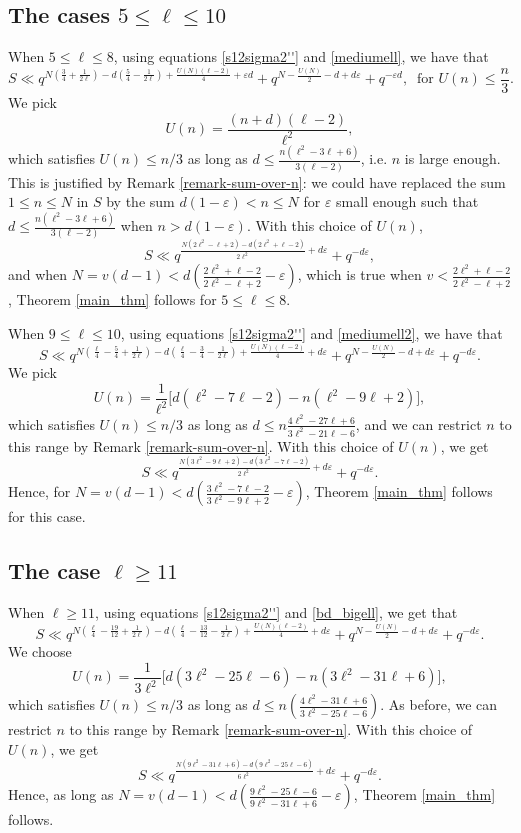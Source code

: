 \documentclass[12pt]{amsart}
\begin{document}
\subsection{The cases $5 \leq \ell \leq 10$}
When $5 \leq \ell \leq 8$, using equations \eqref{s12sigma2''} and \eqref{mediumell}, we have that
$$S \ll q^{N ( \frac{3}{4}+\frac{1}{2\ell})-d(\frac{5}{4}-\frac{1}{2\ell})+ \frac{U(N) (\ell-2)}{4}+\varepsilon d}+ q^{N-\frac{U(N)}{2}-d+d\varepsilon}+ q^{-\varepsilon d}, \;\; \text{for $U(n) \leq \frac{n}{3}$}. $$
We pick
$$U(n) = \frac{ (n+d)(\ell-2)}{\ell^2},$$
which satisfies $U(n)  \leq n/3$ as long as $d \leq \frac{n(\ell^2-3\ell+6)}{3(\ell-2)}$, i.e. $n$ is large enough. This is justified by Remark \ref{remark-sum-over-n}: we could have replaced the sum $1 \leq n \leq N$ in $S$ by the sum $d(1-\varepsilon) < n \leq N$ for $\varepsilon$ small enough such that $d \leq \frac{n(\ell^2-3\ell+6)}{3(\ell-2)}$ when $n > d(1-\varepsilon)$.
With this choice of $U(n)$, 
$$S \ll q^{ \frac{N(2\ell^2-\ell+2)-d(2\ell^2+\ell-2)}{2\ell^2}+d\varepsilon } +q^{-d\varepsilon },$$
and when $N = v(d-1) < d ( \frac{2\ell^2+\ell-2}{2\ell^2-\ell+2}-\varepsilon)$, which is true when $v < \frac{2 \ell^2 + \ell -2}{2\ell^2 - \ell + 2}$, Theorem \ref{main_thm} follows for $5 \leq \ell \leq 8$.




When $9 \leq \ell \leq 10$, using equations \eqref{s12sigma2''} and \eqref{mediumell2}, we have that 
$$ S \ll q^{N (\frac{\ell}{4}-\frac{5}{4}+\frac{1}{2\ell}) - d (\frac{\ell}{4} - \frac{3}{4}-\frac{1}{2\ell})+\frac{U(N)(\ell-2)}{4}+d\varepsilon }+ q^{N-\frac{U(N)}{2}-d+d\varepsilon}+ q^{-d\varepsilon }.$$
We pick
$$U(n) = \frac{1}{\ell^2} \Big[ d(\ell^2-7\ell-2) - n (\ell^2-9\ell+2)\Big],$$
which satisfies $U(n)\leq n/3$ as long as $d \leq n \frac{4\ell^2-27\ell+6}{3\ell^2-21\ell-6}$, and we can restrict $n$ to this range by Remark \ref{remark-sum-over-n}. With this choice of $U(n)$, we get
$$S \ll q^{ \frac{ N(3\ell^2-9\ell+2)- d(3\ell^2-7\ell-2)}{2\ell^2}+d\varepsilon}+ q^{-d \varepsilon }.$$
Hence, for $N = v(d-1) < d (\frac{3\ell^2-7\ell-2}{3\ell^2-9\ell+2}-\varepsilon )$, Theorem \ref{main_thm} follows for this case.

\subsection{The case $\ell \geq 11$}

When $\ell \geq 11$, using equations \eqref{s12sigma2''} and \eqref{bd_bigell}, we get that
$$ S \ll q^{N(\frac{\ell}{4}-\frac{19}{12}+ \frac{1}{2\ell}) - d(\frac{\ell}{4}-\frac{13}{12}-\frac{1}{2\ell}) + \frac{U(N)(\ell-2)}{4}+d \varepsilon} +q^{N-\frac{U(N)}{2}-d+d\varepsilon}+q^{-d\varepsilon }.$$
We choose
$$U(n) = \frac{1}{3\ell^2} \Big[  d (3\ell^2-25 \ell-6) - n ( 3\ell^2 - 31\ell+6)\Big], $$
which satisfies $U(n) \leq n/3$ as long as $d \leq n  \left( \frac{4\ell^2-31\ell+6}{3\ell^2-25\ell-6} \right) $. As before, we can restrict $n$ to this range by Remark \ref{remark-sum-over-n}. With this choice of $U(n)$, we get
$$S \ll q^{ \frac{N(9\ell^2-31\ell+6)-d(9\ell^2-25\ell-6)}{6\ell^2}+d\varepsilon }+q^{-d \varepsilon}.$$
Hence, as long as $N = v(d-1) < d(\frac{9\ell^2-25\ell-6}{9\ell^2-31\ell+6}-\varepsilon)$, Theorem \ref{main_thm} follows.
\end{document}
